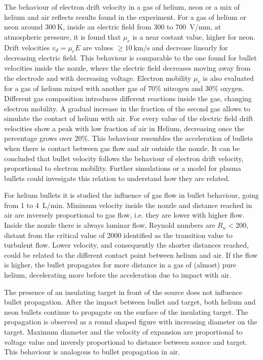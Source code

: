 The behaviour of electron drift velocity in a gas of helium, neon or a mix of helium and air reflects results found in the experiment. For a gas of helium or neon around $\SI{300}{\kelvin}$, inside an electric field from \num{300} to \SI{700}{\volt/\milli\meter}, at atmospheric pressure, it is found that $\mu_e$ is a near costant value, higher for neon. %
Drift velocities $v_{d} = \mu_e E$ are values $\ge \SI{10}{\kilo\meter/\second}$ and decrease linearly for decreasing electric field. This behaviour is comparable to the one found for bullet velocities inside the nozzle, where the electric field decreases moving away from the electrode and with decreasing voltage.
Electron mobility $\mu_e$ is also evaluated for a gas of helium mixed with another gas of $70\%$ nitrogen and $30\%$ oxygen. Different gas composition introduces different reactions inside the gas, changing electron mobility. A gradual increase in the fraction of the second gas allows to simulate the contact of helium with air. For every value of the electric field drift velocities show a peak with low fraction of air in Helium, decreasing once the percentage grows over $20\%$. This behaviour resembles the acceleration of bullets when there is contact between gas flow and air outside the nozzle.
It can be concluded that bullet velocity follows the behaviour of electron drift velocity, proportional to electron mobility. Further simulations or a model for plasma bullets could invesigate this relation to understand how they are related.


For helium bullets it is studied the influence of gas flow in bullet behaviour, going from \num{1} to \SI{4}{\liter/\minute}. Minimum velocity inside the nozzle and distance reached in air are inversely proportional to gas flow, i.e. they are lower with higher flow. Inside the nozzle there is always laminar flow, Reynold numbers are $R_n < \num{200}$, distant from the critical value of \num{2000} identified as the transition value to turbulent flow. Lower velocity, and consequently the shorter distances reached, could be related to the different contact point between helium and air. If the flow is higher, the bullet propagates for more distance in a gas of (almost) pure helium, decelerating more before the acceleration due to impact with air.

The presence of an insulating target in front of the source does not influence bullet propagation. After the impact between bullet and target, both helium and neon bullets continue to propagate on the surface of the insulating target. The propagation is observed as a round shaped figure with increasing diameter on the target. Maximum diameter and the velocity of expansion are proportional to voltage value and inversly proportional to distance between source and target. This behaviour is analogous to bullet propagation in air.

